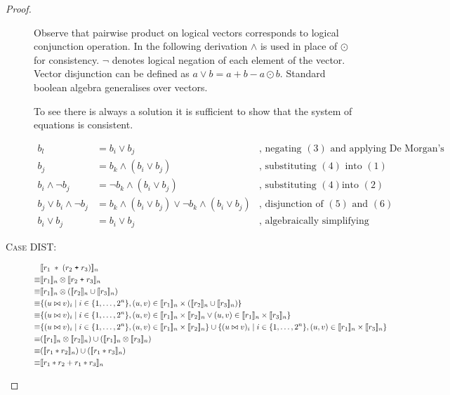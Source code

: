 \begin{proof}
\begin{description}
    Observe that pairwise product on logical vectors corresponds to logical
    conjunction operation. In the following derivation $\wedge$ is used in place
    of $\odot$ for consistency. $\neg$ denotes logical negation of each element
    of the vector. Vector disjunction can be defined as $a \vee b = a + b - a
    \odot b$. Standard boolean algebra generalises over vectors.

    To see there is always a solution it is sufficient to show that the system
    of equations is consistent.

    \begin{align}
      b_l &= b_i \vee b_j & \mbox{, negating $(3)$ and applying De Morgan's law} \\
      b_j &= b_k \wedge (b_i \vee b_j) & \mbox{, substituting $(4)$ into $(1)$} \\
      b_i \wedge \neg b_j &= \neg b_k \wedge (b_i \vee b_j) & \mbox{, substituting $(4)$
        into $(2)$} \\
      b_j \vee b_i \wedge \neg b_j &= b_k \wedge (b_i \vee b_j) \vee \neg b_k \wedge (b_i \vee b_j) & \mbox{, disjunction of $(5)$ and $(6)$} \\
      b_i \vee b_j &= b_i \vee b_j & \mbox{, algebraically simplifying (7)} \nonumber
    \end{align}

  \item[\textsc{Case DIST}:]
    \begin{align*}
             & \llbracket{r_1 \; \ast \; (r_2 \; \texttt{+} \; r_3)}\rrbracket_n \\
      \equiv & \llbracket{r_1}\rrbracket_n \otimes \llbracket{r_2 \; \texttt{+} \; r_3}\rrbracket_n \\
      \equiv & \llbracket{r_1}\rrbracket_n \otimes (\llbracket{r_2}\rrbracket_n \cup \llbracket{r_3}\rrbracket_n) \\
      \equiv & \{ (u \bowtie v)_i \mid i \in \{ 1, \ldots, 2^n \}, (u,v) \in
        \llbracket{r_1}\rrbracket_n \times (\llbracket{r_2}\rrbracket_n \cup \llbracket{r_3}\rrbracket_n) \} \\
      \equiv & \{ (u \bowtie v)_i \mid i \in \{ 1, \ldots, 2^n \}, (u,v) \in
        \llbracket{r_1}\rrbracket_n \times \llbracket{r_2}\rrbracket_n \vee (u,v) \in \llbracket{r_1}\rrbracket_n
        \times \llbracket{r_3}\rrbracket_n \} \\
      \equiv & \{ (u \bowtie v)_i \mid i \in \{ 1, \ldots, 2^n \}, (u,v) \in
        \llbracket{r_1}\rrbracket_n \times \llbracket{r_2}\rrbracket_n \}
        \cup \{ (u \bowtie v)_i \mid i \in \{ 1, \ldots, 2^n \}, (u,v) \in
        \llbracket{r_1}\rrbracket_n \times \llbracket{r_3}\rrbracket_n \} \\
      \equiv & (\llbracket{r_1}\rrbracket_n \otimes \llbracket{r_2}\rrbracket_n)
        \cup (\llbracket{r_1}\rrbracket_n \otimes \llbracket{r_3}\rrbracket_n) \\
      \equiv & (\llbracket{r_1 \ast r_2}\rrbracket_n) \cup (\llbracket{r_1 \ast r_3}\rrbracket_n) \\
      \equiv & \llbracket{r_1 \ast r_2 + r_1 \ast r_3}\rrbracket_n \\
    \end{align*}
\end{description}
\end{proof}
